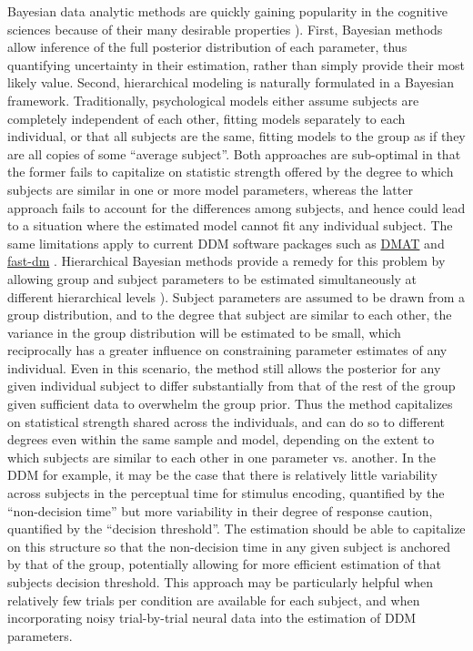 \documentclass[letterpaper,10pt,english]{sphinxmanual}
\begin{document}
Bayesian data analytic methods are quickly gaining popularity in the cognitive sciences because of their many desirable properties \citep{LeeWagenmakers13,Kruschke10}). First, Bayesian methods allow inference of the full posterior distribution of each parameter, thus quantifying uncertainty in their estimation, rather than simply provide their most likely value. Second, hierarchical modeling is naturally formulated in a Bayesian framework. Traditionally, psychological models either assume subjects are completely independent of each other, fitting models separately to each individual, or that all subjects are the same, fitting models to the group as if they are all copies of some ``average subject''. Both approaches are sub-optimal in that the former fails to capitalize on statistic strength offered by the degree to which subjects are similar in one or more model parameters, whereas the latter approach fails to account for the differences among subjects, and hence could lead to a situation where the estimated model cannot fit any individual subject. The same limitations apply to current DDM software packages such as \href{http://ppw.kuleuven.be/okp/software/dmat/}{DMAT} \citep{VandekerckhoveTuerlinckx08} and \href{http://seehuhn.de/pages/fast-dm}{fast-dm} \citep{VossVoss07}. Hierarchical Bayesian methods provide a remedy for this problem by allowing group and subject parameters to be estimated simultaneously at different hierarchical levels \citep{LeeWagenmakers13,Kruschke10,VandekerckhoveTuerlinckxLee11}). Subject parameters are assumed to be drawn from a group distribution, and to the degree that subject are similar to each other, the variance in the group distribution will be estimated to be small, which reciprocally has a greater influence on constraining parameter estimates of any individual. Even in this scenario, the method still allows the posterior for any given individual subject to differ substantially from that of the rest of the group given sufficient data to overwhelm the group prior. Thus the method capitalizes on statistical strength shared across the individuals, and can do so to different degrees even within the same sample and model, depending on the extent to which subjects are similar to each other in one parameter vs. another. In the DDM for example, it may be the case that there is relatively little variability across subjects in the perceptual time for stimulus encoding, quantified by the ``non-decision time'' but more variability in their degree of response caution, quantified by the ``decision threshold''. The estimation should be able to capitalize on this structure so that the non-decision time in any given subject is anchored by that of the group, potentially allowing for more efficient estimation of that subjects decision threshold. This approach may be particularly helpful when relatively few trials per condition are available for each subject, and when incorporating noisy trial-by-trial neural data into the estimation of DDM parameters.\\
\end{document}
